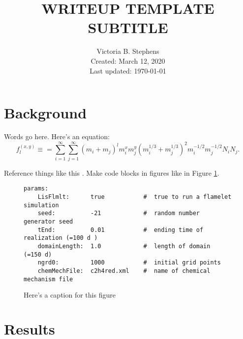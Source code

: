\documentclass[11pt]{article}
\begin{document}
    \title{\uppercase{Writeup template \\ Subtitle}}
\author{Victoria B. Stephens\\
        Created: March 12, 2020 \\  
        Last updated: \today}

\maketitle


\section{Background}
\label{sec:section_label_1}

Words go here. Here's an equation:
\begin{equation}
    f_l^{(x,y)} \equiv = \sum_{i=1}^{\infty} \sum_{j=1}^{\infty} (m_i + m_j)^l m_i^x m_j^y (m_i^{1/3} + m_j^{1/3})^2 m_i^{-1/2}
    m_j^{-1/2} N_i N_j.
\end{equation}

Reference things like this \cite{Leung_1991}. Make code blocks in figures like in Figure \ref{odt_input}.

\begin{figure}
\begin{verbatim}
params:
    LisFlmlt:      true           #  true to run a flamelet simulation
    seed:          -21            #  random number generator seed 
    tEnd:          0.01           #  ending time of realization (=100 d )
    domainLength:  1.0            #  length of domain  (=150 d)
    ngrd0:         1000           #  initial grid points
    chemMechFile:  c2h4red.xml    #  name of chemical mechanism file
\end{verbatim}
    \caption{Here's a caption for this figure}                                                                             
\label{odt_input}
\end{figure}

\section{Results}
\label{sec:section_label_2}
\end{document}
